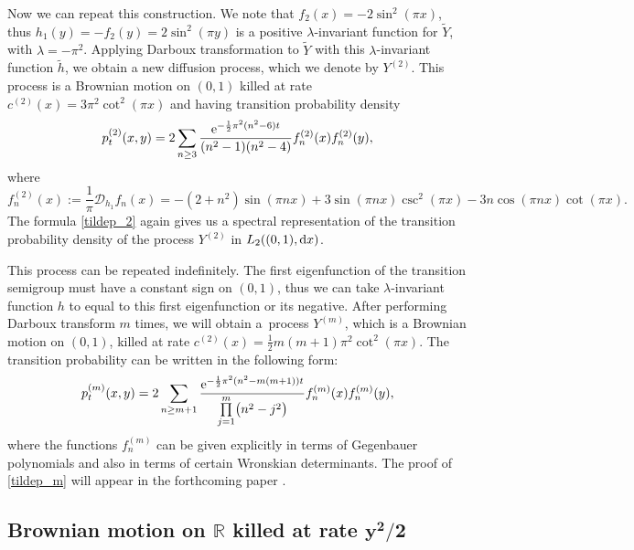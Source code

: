 \documentclass[10pt,a4paper]{amsart}
\numberwithin{equation}{section}
\theoremstyle{definition}
\def\r{{\mathbb R}}
\def\d{{\textnormal d}}
\begin{document}
Now we can repeat this construction. We note that $f_2(x)=-2\sin^2(\pi x)$, thus $h_1(y)=-f_2(y)=2\sin^2(\pi y)$ is a positive $\lambda$-invariant function for $\widetilde Y$, with $\lambda=-\pi^2$. Applying Darboux transformation to $\widetilde Y$ with this $\lambda$-invariant function $\tilde h$, we obtain a new diffusion process, which we denote by $Y^{(2)}$. This process is a Brownian motion on $(0,1)$ killed at rate
$c^{(2)}(x)=3\pi^2 \cot^2(\pi x)$ and having transition probability density
\begin{equation}\label{tildep_2}
p^{(2)}_t(x,y)=2\sum\limits_{n\ge 3} \frac{{\rm e}^{-\frac{1}{2} \pi^2 (n^2-6) t} }{(n^2-1)(n^2-4)} f^{(2)}_n(x) f^{(2)}_n(y),
\end{equation}
where
\[
f^{(2)}_n(x):=\frac{1}{\pi} {\mathcal D}_{h_1} f_n(x)=-(2+n^2) \sin(\pi n x) + 3\sin(\pi n x) \csc^2(\pi x) - 3 n \cos(\pi n x)\cot(\pi x).
\]
The formula \eqref{tildep_2} again gives us a spectral representation of the transition probability density of the process $Y^{(2)}$ in $L_2((0,1), \d x)$.

This process can be repeated indefinitely. The first eigenfunction of the transition semigroup must have a constant sign on $(0,1)$, thus we can take $\lambda$-invariant function $h$ to equal to this first eigenfunction or its negative. After performing Darboux transform $m$ times, we will obtain a~process $Y^{(m)}$, which is a Brownian motion on $(0,1)$, killed at rate $c^{(2)}(x)=\frac{1}{2} m(m+1)\pi^2 \cot^2(\pi x)$. The transition probability can be written in the following form:
\begin{equation}\label{tildep_m}
p^{(m)}_t(x,y)=2\sum\limits_{n\ge m+1} \frac{{\rm e}^{-\frac{1}{2} \pi^2 (n^2-m(m+1)) t}}
{\prod\limits_{j=1}^m \bigl(n^2-j^2\bigr)} f^{(m)}_n(x) f^{(m)}_n(y),
\end{equation}
where the functions $f^{(m)}_n$ can be given explicitly in terms of Gegenbauer polynomials and also in terms of certain Wronskian determinants. The proof of \eqref{tildep_m} will appear in the forthcoming paper \cite{Yuan_2024}.

\subsection[Brownian motion on R killed at rate y\^2/2]{Brownian motion on $\boldsymbol{\r}$ killed at rate $\boldsymbol{y^2/2}$}\label{example5}
\end{document}
